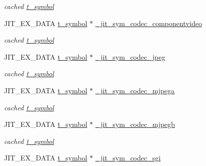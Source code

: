 \begin{DoxyCompactItemize}
\begin{DoxyCompactList}\small\item\em cached \hyperlink{structt__symbol}{t\_\-symbol} \item\end{DoxyCompactList}\item 
\hypertarget{group__jitter_ga145fa95179795698c563c431c94bcec6}{
JIT\_\-EX\_\-DATA \hyperlink{structt__symbol}{t\_\-symbol} $\ast$ \hyperlink{group__jitter_ga145fa95179795698c563c431c94bcec6}{\_\-jit\_\-sym\_\-codec\_\-componentvideo}}
\label{group__jitter_ga145fa95179795698c563c431c94bcec6}

\begin{DoxyCompactList}\small\item\em cached \hyperlink{structt__symbol}{t\_\-symbol} \item\end{DoxyCompactList}\item 
\hypertarget{group__jitter_gae0024863097747f851a19e78c734e7b5}{
JIT\_\-EX\_\-DATA \hyperlink{structt__symbol}{t\_\-symbol} $\ast$ \hyperlink{group__jitter_gae0024863097747f851a19e78c734e7b5}{\_\-jit\_\-sym\_\-codec\_\-jpeg}}
\label{group__jitter_gae0024863097747f851a19e78c734e7b5}

\begin{DoxyCompactList}\small\item\em cached \hyperlink{structt__symbol}{t\_\-symbol} \item\end{DoxyCompactList}\item 
\hypertarget{group__jitter_ga8db004bdaea9032a74262379b84dba95}{
JIT\_\-EX\_\-DATA \hyperlink{structt__symbol}{t\_\-symbol} $\ast$ \hyperlink{group__jitter_ga8db004bdaea9032a74262379b84dba95}{\_\-jit\_\-sym\_\-codec\_\-mjpega}}
\label{group__jitter_ga8db004bdaea9032a74262379b84dba95}

\begin{DoxyCompactList}\small\item\em cached \hyperlink{structt__symbol}{t\_\-symbol} \item\end{DoxyCompactList}\item 
\hypertarget{group__jitter_gaff7aaf216679e914c38976e5f9df15db}{
JIT\_\-EX\_\-DATA \hyperlink{structt__symbol}{t\_\-symbol} $\ast$ \hyperlink{group__jitter_gaff7aaf216679e914c38976e5f9df15db}{\_\-jit\_\-sym\_\-codec\_\-mjpegb}}
\label{group__jitter_gaff7aaf216679e914c38976e5f9df15db}

\begin{DoxyCompactList}\small\item\em cached \hyperlink{structt__symbol}{t\_\-symbol} \item\end{DoxyCompactList}\item 
\hypertarget{group__jitter_ga709f8309f58760559af349bd179b1a5e}{
JIT\_\-EX\_\-DATA \hyperlink{structt__symbol}{t\_\-symbol} $\ast$ \hyperlink{group__jitter_ga709f8309f58760559af349bd179b1a5e}{\_\-jit\_\-sym\_\-codec\_\-sgi}}
\label{group__jitter_ga709f8309f58760559af349bd179b1a5e}


\end{DoxyCompactItemize}
